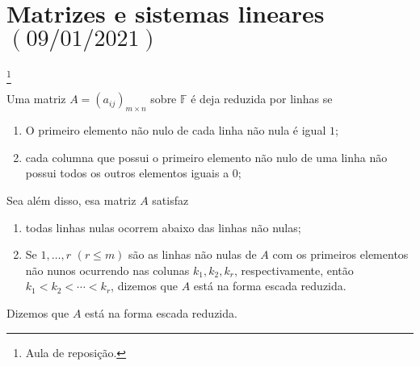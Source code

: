 \chapter{Matrizes e sistemas lineares\quad$\left(09/01/2021\right)$}\footnote{Aula de reposição.}

\begin{definition}
  Uma matriz $A={\left(a_{ij}\right)}_{m\times n}$ sobre $\mathbb{F}$
  é deja reduzida por linhas se

  \begin{enumerate}
    \item

          O primeiro elemento não nulo de cada linha não nula é
          igual $1$;

    \item

          cada columna que possui o primeiro elemento não nulo de uma
          linha não possui todos os outros elementos iguais a $0$;
  \end{enumerate}


  Sea além disso, esa matriz $A$ satisfaz

  \begin{enumerate}[resume]

    \item

          todas linhas nulas ocorrem abaixo das linhas não nulas;

    \item

          Se $1,\dotsc,r$ $\left(r\leq m\right)$ são as linhas não
          nulas de $A$ com os primeiros elementos não nunos ocurrendo
          nas colunas $k_{1},k_{2},k_{r}$, respectivamente, então
          $k_{1}<k_{2}<\dotsb<k_{r}$, dizemos que $A$ está na forma
          escada reduzida.
  \end{enumerate}
\end{definition}

Dizemos que $A$ está na forma escada reduzida.

